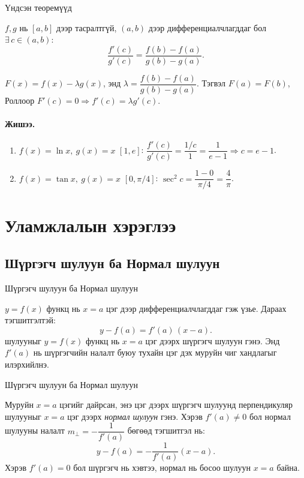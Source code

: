 \begin{frame}[allowframebreaks]{Үндсэн теоремүүд}
\begin{theorem}
$f,g$ нь $[a,b]$ дээр тасралтгүй, $(a,b)$ дээр дифференциалчлагддаг бол $\exists\,c\in(a,b)$:
\[
\frac{f'(c)}{g'(c)}=\frac{f(b)-f(a)}{g(b)-g(a)}.
\]
\end{theorem}

\begin{prof}
$F(x)=f(x)-\lambda g(x)$, энд $\lambda=\dfrac{f(b)-f(a)}{g(b)-g(a)}$. Тэгвэл $F(a)=F(b)$, Роллоор $F'(c)=0\Rightarrow f'(c)=\lambda g'(c)$.
\end{prof}

\paragraph{Жишээ.}
\begin{enumerate}[itemsep=2pt]
\item $f(x)=\ln x,\ g(x)=x$ $[1,e]$: $\dfrac{f'(c)}{g'(c)}=\dfrac{1/c}{1}=\dfrac{1}{e-1}\Rightarrow c=e-1$.
\item $f(x)=\tan x,\ g(x)=x$ $[0,\pi/4]$: $\sec^2 c=\dfrac{1-0}{\pi/4}=\dfrac{4}{\pi}$.
\end{enumerate}
\end{frame}

\section{Уламжлалын хэрэглээ}
\subsection{Шүргэгч шулуун ба Нормал шулуун}
\begin{frame}[allowframebreaks]{Шүргэгч шулуун ба Нормал шулуун}
\begin{definition}
$y=f(x)$ функц нь $x=a$ цэг дээр дифференциалчлагддаг гэж үзье.  
Дараах тэгшитгэлтэй:
\[
\boxed{y - f(a) = f'(a)\,(x - a).}
\] шулууныг $y=f(x)$ функц нь $x=a$ цэг дээрх шүргэгч шулуун гэнэ.
Энд $f'(a)$ нь шүргэгчийн налалт буюу тухайн цэг дэх муруйн чиг хандлагыг илэрхийлнэ.
\end{definition}
\end{frame}

\begin{frame}[allowframebreaks]{Шүргэгч шулуун ба Нормал шулуун}
\begin{definition}
Муруйн $x=a$ цэгийг дайрсан, энэ цэг дээрх  шүргэгч шулуунд перпендикуляр шулууныг $x=a$ цэг дээрх \emph{нормал шулуун} гэнэ.  
Хэрэв $f'(a)\ne 0$ бол нормал шулууны налалт $m_\perp=-\dfrac{1}{f'(a)}$ бөгөөд тэгшитгэл нь:
\[
\boxed{y - f(a) = -\frac{1}{f'(a)}(x - a).}
\]
Хэрэв $f'(a)=0$ бол шүргэгч нь хэвтээ, нормал нь босоо шулуун $x=a$ байна.
\end{definition}
\end{frame}

